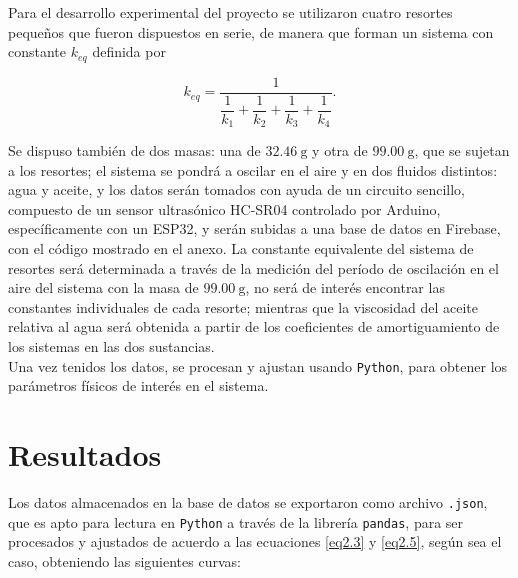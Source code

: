 \documentclass[final,5p,times,twocolumn, nopreprintline]{elsarticle}
\numberwithin{equation}{section}
\begin{document}
Para el desarrollo experimental del proyecto se utilizaron cuatro resortes pequeños que fueron dispuestos en serie, de manera que forman un sistema con constante $k_{eq}$ definida por

\begin{equation}
k_{eq}=\dfrac{1}{\dfrac{1}{k_1}+\dfrac{1}{k_2}+\dfrac{1}{k_3}+\dfrac{1}{k_4}}.
\end{equation}\label{eq3.1}

Se dispuso también de dos masas: una de $32.46~\text{g}$ y otra de $99.00~\text{g}$, que se sujetan a los resortes; el sistema se pondrá a oscilar en el aire y en dos fluidos distintos: agua y aceite, y los datos serán tomados con ayuda de un circuito sencillo, compuesto de un sensor ultrasónico HC-SR04 \cite{datasheet} controlado por Arduino, específicamente con un ESP32, y serán subidas a una base de datos en Firebase, con el código mostrado en el anexo. La constante equivalente del sistema de resortes será determinada a través de la medición del período de oscilación en el aire del sistema con la masa de $99.00~\text{g}$, no será de interés encontrar las constantes individuales de cada resorte; mientras que la viscosidad del aceite relativa al agua será obtenida a partir de los coeficientes de amortiguamiento de los sistemas en las dos sustancias.\\

Una vez tenidos los datos, se procesan y ajustan usando \texttt{Python}, para obtener los parámetros físicos de interés en el sistema.

\section{Resultados}

Los datos almacenados en la base de datos se exportaron como archivo \texttt{.json}, que es apto para lectura en \texttt{Python} a través de la librería \texttt{pandas}, para ser procesados y ajustados de acuerdo a las ecuaciones \ref{eq2.3} y \ref{eq2.5}, según sea el caso, obteniendo las siguientes curvas:
\end{document}
